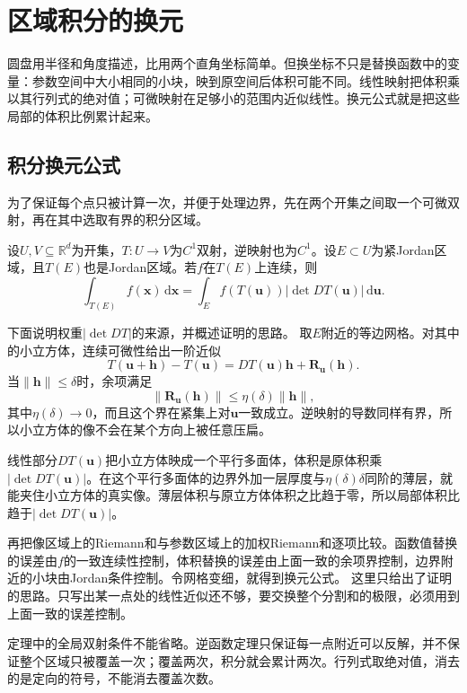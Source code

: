 \section{区域积分的换元}
\label{sec:classical-change-variables}

圆盘用半径和角度描述，比用两个直角坐标简单。但换坐标不只是替换函数中的变量：参数空间中大小相同的小块，映到原空间后体积可能不同。线性映射把体积乘以其行列式的绝对值；可微映射在足够小的范围内近似线性。换元公式就是把这些局部的体积比例累计起来。

\subsection{积分换元公式}

为了保证每个点只被计算一次，并便于处理边界，先在两个开集之间取一个可微双射，再在其中选取有界的积分区域。
\begin{theorem}[经典区域积分的换元]
\label{thm:classical-change-of-variables}
设$U,V\subseteq\mathbb R^d$为开集，$T:U\to V$为$C^1$双射，逆映射也为$C^1$。设$E\subset U$为紧Jordan区域，且$T(E)$也是Jordan区域。若$f$在$T(E)$上连续，则
\begin{equation}
 \int_{T(E)}f(\bm x)\,\mathrm d\bm x
 =\int_E f(T(\bm u))|\det DT(\bm u)|\,\mathrm d\bm u.
\label{eq:classical-change-of-variables}
\end{equation}
\end{theorem}

下面说明权重$|\det DT|$的来源，并概述证明的思路。
取$E$附近的等边网格。对其中的小立方体，连续可微性给出一阶近似
\[
 T(\bm u+\bm h)-T(\bm u)=DT(\bm u)\bm h+\bm R_{\bm u}(\bm h).
\]
当$\|\bm h\|\leq\delta$时，余项满足
\[
 \|\bm R_{\bm u}(\bm h)\|\leq\eta(\delta)\|\bm h\|,
\]
其中$\eta(\delta)\to0$，而且这个界在紧集上对$\bm u$一致成立。逆映射的导数同样有界，所以小立方体的像不会在某个方向上被任意压扁。

线性部分$DT(\bm u)$把小立方体映成一个平行多面体，体积是原体积乘$|\det DT(\bm u)|$。在这个平行多面体的边界外加一层厚度与$\eta(\delta)\delta$同阶的薄层，就能夹住小立方体的真实像。薄层体积与原立方体体积之比趋于零，所以局部体积比趋于$|\det DT(\bm u)|$。

再把像区域上的Riemann和与参数区域上的加权Riemann和逐项比较。函数值替换的误差由$f$的一致连续性控制，体积替换的误差由上面一致的余项界控制，边界附近的小块由Jordan条件控制。令网格变细，就得到换元公式。
这里只给出了证明的思路。只写出某一点处的线性近似还不够，要交换整个分割和的极限，必须用到上面一致的误差控制。

定理中的全局双射条件不能省略。逆函数定理只保证每一点附近可以反解，并不保证整个区域只被覆盖一次；覆盖两次，积分就会累计两次。行列式取绝对值，消去的是定向的符号，不能消去覆盖次数。

